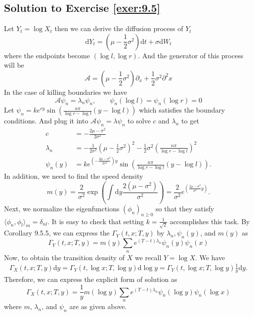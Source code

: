 \documentclass[12pt]{book}
\numberwithin{equation}{chapter}
\theoremstyle{plain}
\numberwithin{theorem}{section}
\theoremstyle{definition}
\numberwithin{exercise}{chapter}
\newcommand{\<}{\langle}
\renewcommand{\>}{\rangle}
\renewcommand{\(}{\left(}
\renewcommand{\)}{\right)}
\renewcommand{\[}{\left[}
\renewcommand{\]}{\right]}
\newcommand\lam{\lambda}
\newcommand\dd{\mathrm{d}}
\begin{document}
\subsection*{Solution to Exercise \ref{exer:9.5}}
Let $Y_t = \log X_t$ then we can derive the diffusion process of $Y_t$
$$\dd Y_t = (\mu - \frac{1}{2}\sigma^2) \dd t + \sigma \dd W_t  $$
where the endpoints become $(\log l, \log r)$. And the generator of this process will be
$$ \mathcal{A}= (\mu - \frac{1}{2} \sigma^2)\partial_x + \frac{1}{2}\sigma^2 \partial^2 x  $$
In the case of killing boundaries we have
$$ \mathcal{A} \psi_n = \lambda_n \psi_n, \quad \quad \psi_n(\log l) = \psi_n(\log r) = 0   $$
Let $\psi_n =  ke^{cy} \sin \left( \frac{n \pi}{\log r - \log l} (y- \log l) \right)$  which satisfies the boundary conditions. And plug it into $ \mathcal{A} \psi_n = \lambda \psi_n$ to solve $c$ and $\lambda_n$ to get
\begin{align}
c &= -\frac{ 2\mu - \sigma^2 }{2\sigma^2}\\
\lambda_n &= -\frac{1}{2 \sigma^2}(\mu - \frac{1}{2} \sigma^2)^2 - \frac{1}{2}\sigma^2 (\frac{n\pi}{\log r - \log l})^2\\
\psi_n(y) &=  ke^{ (-\frac{2\mu - \sigma^2 }{2 \sigma^2})y} \sin \left( \frac{n \pi}{\log r - \log l} (y- \log l) \right).
\end{align}
In addition, we need to find the speed density
$$ m(y) = \frac{2}{\sigma^2}\exp (\int \dd y \frac{2(\mu - \sigma^2)}{\sigma^2}) = \frac{2}{\sigma^2} e^{(\frac{2\mu-\sigma^2}{\sigma^2} y)}.$$
Next, we normalize the eigenfunctions $(\phi_n)_{n \geq0}$ so that they satisfy $\<\phi_n,\phi_l\>_m = \delta_{nl}$. It is easy to check that setting $k = \frac{1}{\sqrt{2}}$ accomplishes this task.  By Corollary 9.5.5, we can express the $\Gamma_Y (t,x; T,y)$ by $\lambda_n, \psi_n(y)$, and $m(y)$ as
$$ \Gamma_Y (t,x; T,y) = m(y) \sum_n e^{(T-t)\lambda_n} \psi_n(y) \psi_n(x)$$
Now, to obtain the transition density of $X$ we recall $Y=\log X$. We have
\begin{align}
\Gamma_{X}(t,x; T,y) \dd y = \Gamma_{Y}(t,\log x; T,\log y) \dd \log y  = \Gamma_{Y}(t,\log x; T,\log y) \frac{1}{y} \dd y .
\end{align}
Therefore, we can express the explicit form of solution as
$$ \Gamma_{X}(t,x; T,y) = \frac{1}{y} m(\log y) \sum_n e^{(T-t)\lambda_n} \psi_n(\log y) \psi_n( \log x) $$
where $m$, $\lam_n$, and $\psi_n$ are as given above.
\end{document}
